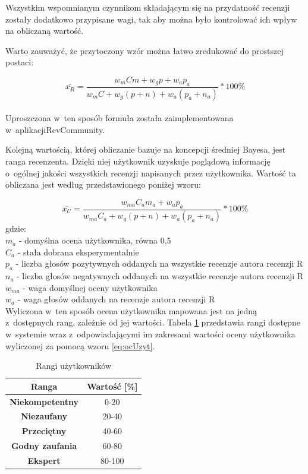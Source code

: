 Wszystkim wspomnianym czynnikom składającym się na przydatność recenzji zostały dodatkowo przypisane wagi, tak aby można było kontrolować ich wpływ na obliczaną wartość.

Warto zauważyć, że przytoczony wzór można łatwo zredukować do prostszej postaci:

\begin{equation}\label{eq:przydatnosc}
\bar{x_{R}}=\frac{w_{m}Cm+w_{g}{p}+w_{a}p_{a}}{w_{m}C+w_{g}(p+n)+w_{a}(p_{a}+n_{a})}*100\%
\end{equation}\\

Uproszczona w~ten sposób formuła została zaimplementowana w~aplikacji\linebreak RevCommunity.

Kolejną wartością, której obliczanie bazuje na koncepcji średniej Bayesa, jest ranga recenzenta. Dzięki niej użytkownik uzyskuje poglądową informację o~ogólnej jakości wszystkich recenzji napisanych przez użytkownika. Wartość ta obliczana jest według przedstawionego poniżej wzoru:

\begin{equation}\label{eq:ocUzyt}
\bar{x_{U}}=\frac{w_{ma}C_{a}m_{a}+w_{a}p_{a}}{w_{ma}C_{a}+w_{g}(p+n)+w_{a}(p_{a}+n_{a})}*100\%
\end{equation}
gdzie:\\
$m_{a}$ - domyślna ocena użytkownika, równa 0,5\\
$C_{a}$ - stała dobrana eksperymentalnie\\
$p_{a}$ - liczba głosów pozytywnych oddanych na wszystkie recenzje autora recenzji R\\
$n_{a}$ - liczba głosów negatywnych oddanych na wszystkie recenzje autora recenzji R\\
$w_{ma}$ - waga domyślnej oceny użytkownika\\
$w_{a}$ - waga głosów oddanych na recenzje autora recenzji R\\

Wyliczona w~ten sposób ocena użytkownika mapowana jest na jedną z~dostępnych rang, zależnie od jej wartości. Tabela \ref{tab:rangi} przedstawia rangi dostępne w~systemie wraz z~odpowiadającymi im zakresami wartości oceny użytkownika wyliczonej za pomocą wzoru \ref{eq:ocUzyt}.

\begin{table}[H]
\centering
\begin{tabular}{|c||c|}  
\hline
\textbf{Ranga} & \textbf{Wartość [\%]} \\
\hline\hline
\textbf{Niekompetentny} & 0-20 \\  
\hline
\textbf{Niezaufany} & 20-40 \\  
\hline
\textbf{Przeciętny} & 40-60 \\  
\hline
\textbf{Godny zaufania} & 60-80 \\  
\hline
\textbf{Ekspert} & 80-100 \\  
\hline
\end{tabular}
\caption{Rangi użytkowników}\label{tab:rangi}
\end{table}


